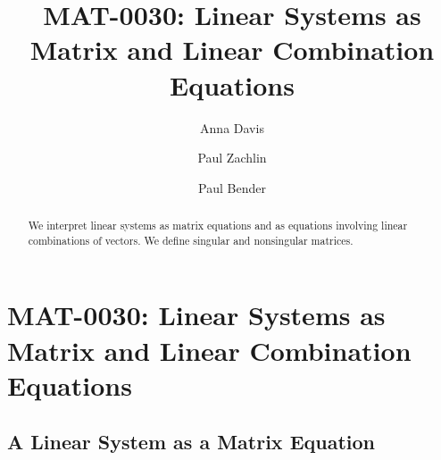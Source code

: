 \documentclass{ximera}
\author{Anna Davis \and Paul Zachlin \and Paul Bender} \title{MAT-0030: Linear Systems as Matrix and Linear Combination Equations} \license{CC-BY 4.0}
\begin{document}
\begin{abstract}
  We interpret linear systems as matrix equations and as equations involving linear combinations of vectors.  We define singular and nonsingular matrices.
\end{abstract}
\maketitle

\section*{MAT-0030: Linear Systems as Matrix and Linear Combination Equations}

\subsection*{A Linear System as a Matrix Equation}
\end{document}
